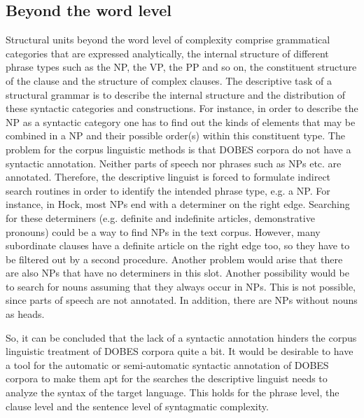 \subsection{Beyond the word level}
\label{bouda:sec:beyondthewordlevel}

Structural units beyond the word level of complexity comprise grammatical categories that are expressed analytically, the internal structure of different phrase types such as the NP, the VP, the PP and so on, the constituent structure of the clause and the structure of complex clauses. The descriptive task of a structural grammar is to describe the internal structure and the distribution of these syntactic categories and constructions. For instance, in order to describe the NP as a syntactic category one has to find out the kinds of elements that may be combined in a NP and their possible order(s) within this constituent type. The problem for the corpus linguistic methods is that DOBES corpora do not have a syntactic annotation. Neither parts of speech nor phrases such as NPs etc. are annotated. Therefore, the descriptive linguist is forced to formulate indirect search routines in order to identify the intended phrase type, e.g. a NP. For instance, in Hoc{\A}k, most NPs end with a determiner on the right edge. Searching for these determiners (e.g. definite and indefinite articles, demonstrative pronouns) could be a way to find NPs in the text corpus. However, many subordinate clauses have a definite article on the right edge too, so they have to be filtered out by a second procedure. Another problem would arise that there are also NPs that have no determiners in this slot. Another possibility would be to search for nouns assuming that they always occur in NPs. This is not possible, since parts of speech are not annotated. In addition, there are NPs without nouns as heads. 

So, it can be concluded that the lack of a syntactic annotation hinders the corpus linguistic treatment of DOBES corpora quite a bit. It would be desirable to have a tool for the automatic or semi-automatic syntactic annotation of DOBES corpora to make them apt for the searches the descriptive linguist needs to analyze the syntax of the target language. This holds for the phrase level, the clause level and the sentence level of syntagmatic complexity.

